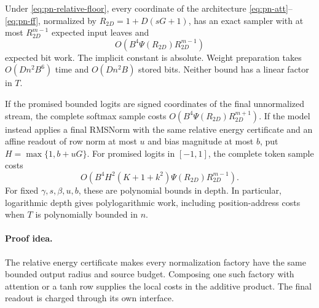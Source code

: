 \begin{theorem}
\label{thm:pn-relative}
Under \eqref{eq:pn-relative-floor}, every coordinate of the architecture
\eqref{eq:pn-att}--\eqref{eq:pn-ff}, normalized by
$R_{2D}=1+D(sG+1)$, has an exact sampler with at most
$R_{2D}^{m-1}$ expected input leaves and
\begin{equation}
 O\!\left(B^4\Psi(R_{2D})R_{2D}^{m-1}\right)
 \label{eq:pn-polydepth}
\end{equation}
expected bit work. The implicit constant is absolute. Weight preparation
takes $O(Dn^2B^6)$ time and $O(Dn^2B)$ stored bits. Neither bound has a
linear factor in $T$.

If the promised bounded logits are signed coordinates of the final
unnormalized stream, the complete softmax sample costs
$O(B^4\Psi(R_{2D})R_{2D}^{m+1})$. If the model instead applies a final RMSNorm with the
same relative energy certificate and an affine readout of row norm at
most $u$ and bias magnitude at most $b$, put
$H=\max\{1,b+uG\}$. For promised logits in $[-1,1]$, the complete token
sample costs
\begin{equation}
 O\!\left(B^4H^2(K+1+k^2)\Psi(R_{2D})R_{2D}^{m-1}\right).
 \label{eq:pn-finalnorm}
\end{equation}
For fixed $\gamma,s,\beta,u,b$, these are polynomial bounds in depth.
In particular, logarithmic depth gives polylogarithmic work, including
position-address costs when $T$ is polynomially bounded in $n$.
\end{theorem}
\paragraph{Proof idea.}
The relative energy certificate makes every normalization factory
have the same bounded output radius and source budget. Composing one such
factory with attention or a tanh row supplies the local costs in the
additive product. The final readout is charged through its own interface.

